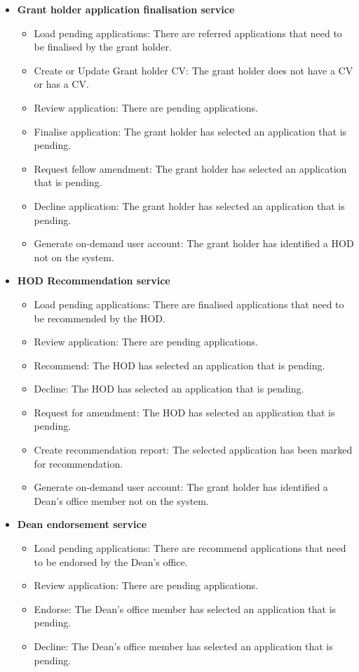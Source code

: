 \documentclass[12pt]{article}
\begin{document}
\begin{itemize}
	\item \textbf{Grant holder application finalisation service}
		\begin{itemize}
			\item Load pending applications: There are referred applications that need to be finalised by the grant holder.
			\item Create or Update Grant holder CV: The grant holder does not have a CV or has a CV.
			\item Review application: There are pending applications.
			\item Finalise application: The grant holder has selected an application that is pending. 
			\item Request fellow amendment: The grant holder has selected an application that is pending.
			\item Decline application: The grant holder has selected an application that is pending.
			\item Generate on-demand user account: The grant holder has identified a HOD not on the system.								
		\end{itemize}
			
	\item \textbf{HOD Recommendation service}
		\begin{itemize}
			\item Load pending applications: There are finalised applications that need to be recommended by the HOD.
			\item Review application: There are pending applications.
			\item Recommend: The HOD has selected an application that is pending. 
			\item Decline: The HOD has selected an application that is pending. 
			\item Request for amendment: The HOD has selected an application that is pending. 
			\item Create recommendation report: The selected application has been marked for recommendation.				
			\item Generate on-demand user account: The grant holder has identified a Dean's office member not on the system.										
		\end{itemize}
		
	\item \textbf{Dean endorsement service}
		\begin{itemize}
			\item Load pending applications: There are recommend applications that need to be endorsed by the Dean's office.
			\item Review application: There are pending applications.
			\item Endorse: The Dean's office member has selected an application that is pending.  
			\item Decline: The Dean's office member has selected an application that is pending.										
		\end{itemize}
	

\end{itemize}
\end{document}
